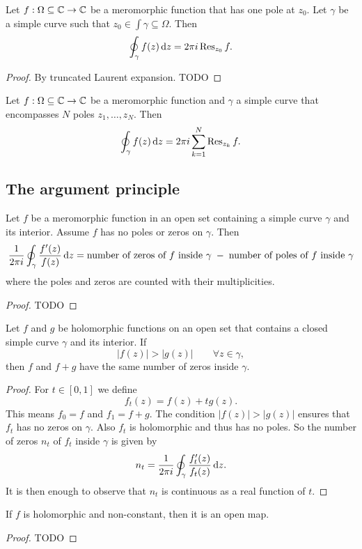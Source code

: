 \begin{proposition}
Let $f: \Omega\subseteq \mathbb{C}\to \mathbb{C}$ be a meromorphic function that has one pole at $z_0$. Let $\gamma$ be a simple curve such that $z_0\in \int\gamma \subseteq \Omega$. Then
\[ \oint_\gamma f(z) \operatorname{d \!}{z} = 2\pi i \operatorname{Res}_{z_0}f. \]
\end{proposition}
\begin{proof}
By truncated Laurent expansion. TODO
\end{proof}
\begin{corollary}
Let $f: \Omega\subseteq \mathbb{C}\to \mathbb{C}$ be a meromorphic function and $\gamma$ a simple curve that encompasses $N$ poles $z_1, \ldots, z_N$. Then
\[ \oint_{\gamma} f(z)\operatorname{d \!}{z} = 2\pi i \sum_{k=1}^N\operatorname{Res}_{z_k}f. \]
\end{corollary}

\subsection{The argument principle}
\begin{proposition}
Let $f$ be a meromorphic function in an open set containing a simple curve $\gamma$ and its interior. Assume $f$ has no poles or zeros on $\gamma$. Then
\[ \frac{1}{2\pi i}\oint_\gamma \frac{f'(z)}{f(z)}\operatorname{d \!}{z} = \text{number of zeros of $f$ inside $\gamma$} \;-\; \text{number of poles of $f$ inside $\gamma$} \]
where the poles and zeros are counted with their multiplicities.
\end{proposition}
\begin{proof}
TODO
\end{proof}

\begin{theorem}
Let $f$ and $g$ be holomorphic functions on an open set that contains a closed simple curve $\gamma$ and its interior. If
\[ |f(z)| > |g(z)| \qquad \forall z\in \gamma, \]
then $f$ and $f+g$ have the same number of zeros inside $\gamma$.
\end{theorem}
\begin{proof}
For $t\in [0, 1]$ we define
\[ f_t(z) = f(z) + tg(z). \]
This means $f_0 = f$ and $f_1 = f+g$. The condition $|f(z)| > |g(z)|$ ensures that $f_t$ has no zeros on $\gamma$. Also $f_t$ is holomorphic and thus has no poles. So the number of zeros $n_t$ of $f_t$ inside $\gamma$ is given by
\[ n_t = \frac{1}{2\pi i}\oint_\gamma \frac{f_t'(z)}{f_t(z)}\operatorname{d \!}{z}. \]
It is then enough to observe that $n_t$ is continuous as a real function of $t$.
\end{proof}
\begin{corollary}
If $f$ is holomorphic and non-constant, then it is an open map.
\end{corollary}
\begin{proof}
TODO
\end{proof}

